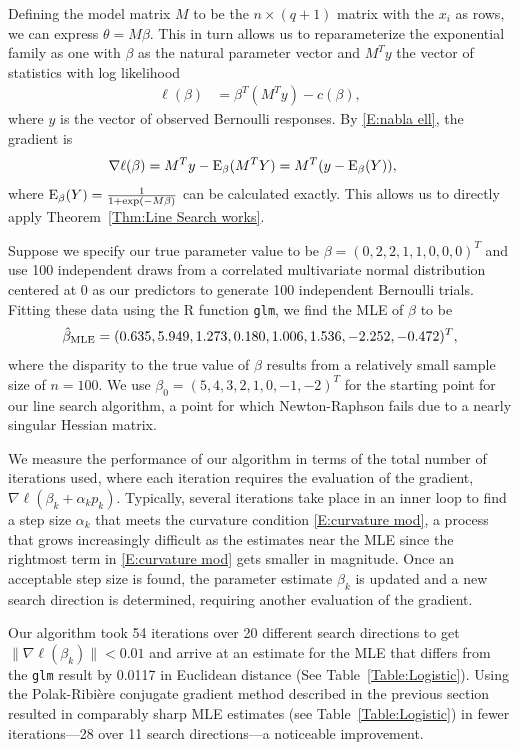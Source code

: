 Defining the model matrix $M$ to be the $n \times (q+1)$ matrix with the $x_i$ as 
rows, we can express $\theta = M \beta
$.  This in turn allows us to reparameterize the exponential family  as one with $
\beta$ as the natural parameter 
vector and $M^T y$ the vector of statistics with log likelihood
\begin{align*}
		 \ell(\beta) &=  \beta^T (M^T y) - c(\beta),
\end{align*}
where $y$ is the vector of observed Bernoulli responses.
By \eqref{E:nabla ell}, the gradient is
\begin{align*}
	\nabla \ell( \beta ) &=  M^T y - \operatorname{E}_{\beta}(M^T Y) = M^T( y - \operatorname{E}_{\beta}(Y) ),
\end{align*}
where $\operatorname{E}_{\beta}(Y) = \frac{1}{1 + \exp(-M \beta)}$ can be calculated exactly.  This 
allows us to directly apply 
Theorem~\ref{Thm:Line Search works}.

Suppose we specify our true parameter value to be $\beta = (0, 2, 2, 1, 1, 0, 0, 0)^T$ 
and use 100 independent draws 
from a correlated multivariate normal distribution centered at 0 as our predictors to 
generate 100 independent 
Bernoulli trials.  
Fitting these data using the R function \texttt{glm}, we find the MLE of $\beta$ to be
\begin{align*}
	\hat{\beta}_{\textrm{MLE}} = (  0.635,  5.949, 1.273, 0.180, 1.006, 1.536, -2.252, -0.472 )^T,
\end{align*}
where the disparity to the true value of $\beta$ results from a relatively small 
sample size of $n=100$.
We use $\beta_0 = ( 5, 4, 3, 2, 1, 0, -1, -2)^T$ for the starting point for our line 
search algorithm, a point for 
which Newton-Raphson fails due to a nearly singular Hessian matrix.  

We measure the performance of our algorithm in terms of the total number of iterations 
used, where each iteration 
requires the evaluation of the gradient, $\nabla \ell( \beta_k + \alpha_k p_k )$.  
Typically, several iterations take 
place in an inner loop to find a step size $\alpha_k$ that meets the curvature 
condition \eqref{E:curvature mod}, a 
process that grows increasingly difficult as the estimates near the MLE since the 
rightmost term in \eqref{E:curvature 
mod} gets smaller in magnitude.  Once an acceptable step size is found, the parameter 
estimate $\beta_k$ is updated and 
a new search direction is determined, requiring another evaluation of the gradient.

Our algorithm took 54 iterations over 20 different search directions to get $\lVert 
\nabla \ell( \beta_k ) \rVert < 
0.01$ and arrive at an estimate for the MLE that differs from the \texttt{glm} result 
by 0.0117 in Euclidean distance 
(See Table~\ref{Table:Logistic}).  
Using the Polak-Ribi\`{e}re conjugate gradient method described in the previous 
section  resulted in comparably sharp 
MLE estimates (see Table~\ref{Table:Logistic}) in fewer iterations---28 over 11 search 
directions---a noticeable 
improvement. 

